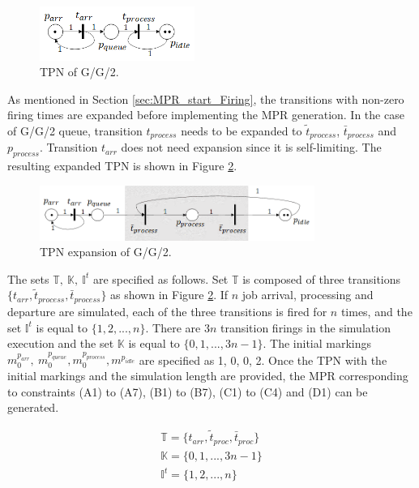 \documentclass[suppldata]{interact}
\theoremstyle{plain}
\theoremstyle{definition}
\theoremstyle{remark}
\begin{document}
\begin{figure}[h]
	\centering
	\includegraphics[width=0.45\textwidth]{Figures/TPN-GG2.png}
	\caption{TPN of G/G/2.}
	\label{fig:tpn_GG2}
\end{figure}

As mentioned in Section \ref{sec:MPR_start_Firing}, the transitions with non-zero firing times are expanded before implementing the MPR generation. In the case of G/G/2 queue, transition $t_{process}$ needs to be expanded to $\tilde{t}_{process}$, $\bar{t}_{process}$ and $p_{process}$. Transition $t_{arr}$ does not need expansion since it is self-limiting. The resulting expanded TPN is shown in Figure \ref{fig:tpn_GG2_expansion}.  

\begin{figure}[h]
	\centering
	\includegraphics[width=0.8\textwidth]{Figures/TPN-GG2-expansion.png}
	\caption{TPN expansion of G/G/2.}
	\label{fig:tpn_GG2_expansion}
\end{figure}

The sets $\mathbb{T},\ \mathbb{K},\ \mathbb{I}^t$ are specified as follows. Set $\mathbb{T}$ is composed of three transitions $\{t_{arr},\tilde{t}_{process}, \bar{t}_{process}\}$ as shown in Figure \ref{fig:tpn_GG2_expansion}. If $n$ job arrival, processing and departure are simulated, each of the three transitions is fired for $n$ times, and the set $\mathbb{I}^t$ is equal to $\{1,2,..., n\}$. There are $3n$ transition firings in the simulation execution and the set $\mathbb{K}$ is equal to $\{0,1,..., 3n-1\}$. The initial markings $m^{p_{arr}}_0,\ m^{p_{queue}}_0, m^{p_{process}}_0, m^{p_{idle}}$ are specified as 1, 0, 0, 2. Once the TPN with the initial markings and the simulation length are provided, the MPR %
corresponding to constraints (A1) to (A7), (B1) to (B7), (C1) to (C4) and (D1) can be generated. 

\begin{eqnarray}
	\mathbb{T} = \{t_{arr},\tilde{t}_{proc}, \bar{t}_{proc}\} \nonumber\\
	\mathbb{K} = \{0,1,..., 3n-1\} \nonumber\\
	\mathbb{I}^t=\{1,2,..., n\} \nonumber
\end{eqnarray}
\end{document}
